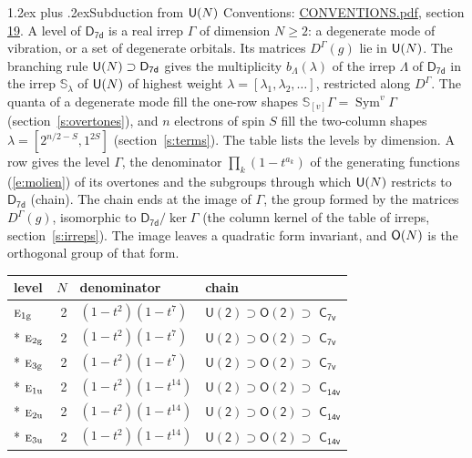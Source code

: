 \documentclass[10pt,a4paper]{article}
\makeatletter
\renewcommand\section{\@startsection{section}{1}{\z@}{-3ex plus -1ex minus -.2ex}%
  {1.2ex plus .2ex}{\normalfont\large\sffamily\bfseries\color{parttitle}}}
\numberwithin{equation}{section}
\newcommand{\grp}[1]{\mathsf{#1}}
\newcommand{\irr}[1]{\text{\normalfont\scshape #1}}
\newcommand{\ptag}[1]{\mathrm{#1}}
\newcommand{\repD}[1]{D^{#1}}
\newcommand{\schur}[1]{\mathbb{S}_{#1}}
\newcommand{\shape}[1]{[#1]}
\makeatother
\begin{document}
\section{Subduction from \texorpdfstring{$\grp{U(\mathnormal{N})}$}{U(N)}}\label{s:unitary}
Conventions: \href{../../CONVENTIONS.pdf}{CONVENTIONS.pdf}, section \href{../../CONVENTIONS.pdf\#conv.19}{19}.
\leavevmode\label{n:local.level.dimension}A level of $\grp{D_{7d}}$ is a real irrep $\Gamma$ of dimension $N \ge 2$: a degenerate mode of vibration, or a set of degenerate orbitals. \label{n:group.unitary}Its matrices $\repD{\Gamma}(g)$ lie in $\grp{U(\mathnormal{N})}$. \label{n:irrep.schur}\label{n:shape.partition}\label{n:local.partition}\label{n:function.multiplicity.unitary}The branching rule $\grp{U(\mathnormal{N})} \supset \grp{D_{7d}}$ gives the multiplicity $b_\Lambda(\lambda)$ of the irrep $\Lambda$ of $\grp{D_{7d}}$ in the irrep $\schur{\lambda}$ of $\grp{U(\mathnormal{N})}$ of highest weight $\lambda = \shape{\lambda_1, \lambda_2, \dots}$, restricted along $\repD{\Gamma}$. \label{n:local.partition.power}\label{n:local.electrons}\label{n:local.spin}The quanta of a degenerate mode fill the one-row shapes $\schur{\shape{v}}\Gamma = \operatorname{Sym}^{v}\Gamma$ (section~\ref{s:overtones}), and $n$ electrons of spin $S$ fill the two-column shapes $\lambda = \shape{2^{n/2-S}, 1^{2S}}$ (section~\ref{s:terms}).
The table lists the levels by dimension. \label{n:head.level}\label{n:head.denominator}\label{n:index.overtone.denominator}\label{n:head.chain}A row gives the level $\Gamma$, the denominator $\prod_k (1 - t^{a_k})$ of the generating functions (\ref{e:molien}) of its overtones and the subgroups through which $\grp{U(\mathnormal{N})}$ restricts to $\grp{D_{7d}}$ (chain). The chain ends at the image of $\Gamma$, the group formed by the matrices $\repD{\Gamma}(g)$, isomorphic to $\grp{D_{7d}}/\ker\Gamma$ (the column kernel of the table of irreps, section~\ref{s:irreps}). The image leaves a quadratic form invariant, and $\grp{O(\mathnormal{N})}$ is the orthogonal group of that form.
{\small\begin{longtable}{@{}lrll@{}}\toprule
level & $N$ & denominator & chain\\\midrule\endhead
\bottomrule\endfoot\endlastfoot
$\irr{e}_{1\ptag{g}}$ & 2 & $(1-t^{2})(1-t^{7})$ & $\grp{U(2)} \supset \grp{O(2)} \supset$ \href{C7v.pdf}{$\grp{C_{7v}}$}\\*
$\irr{e}_{2\ptag{g}}$ & 2 & $(1-t^{2})(1-t^{7})$ & $\grp{U(2)} \supset \grp{O(2)} \supset$ \href{C7v.pdf}{$\grp{C_{7v}}$}\\*
$\irr{e}_{3\ptag{g}}$ & 2 & $(1-t^{2})(1-t^{7})$ & $\grp{U(2)} \supset \grp{O(2)} \supset$ \href{C7v.pdf}{$\grp{C_{7v}}$}\\*
$\irr{e}_{1\ptag{u}}$ & 2 & $(1-t^{2})(1-t^{14})$ & $\grp{U(2)} \supset \grp{O(2)} \supset$ $\grp{C_{14v}}$\\*
$\irr{e}_{2\ptag{u}}$ & 2 & $(1-t^{2})(1-t^{14})$ & $\grp{U(2)} \supset \grp{O(2)} \supset$ $\grp{C_{14v}}$\\*
$\irr{e}_{3\ptag{u}}$ & 2 & $(1-t^{2})(1-t^{14})$ & $\grp{U(2)} \supset \grp{O(2)} \supset$ $\grp{C_{14v}}$\\
\bottomrule\end{longtable}}
\end{document}
